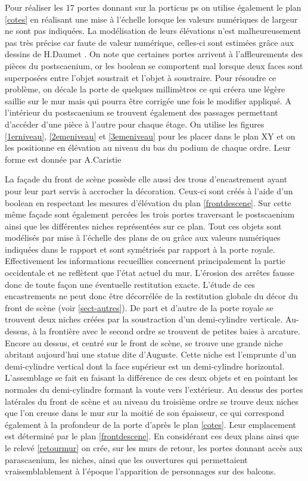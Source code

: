 Pour réaliser les 17 portes donnant sur la \gls{porticus ps} on utilise également le plan \ref{cotes} en réalisant une mise à l'échelle lorsque les valeurs numériques de largeur ne sont pas indiquées. La modélisation de leurs élévations n'est malheureusement pas très précise car faute de valeur numérique, celles-ci sont estimées grâce aux dessins de H.Daumet \cite[Pl. XII, XIII, XIV]{orangePl}. On note que certaines portes arrivent à l'affleurements des pièces du \gls{postscaenium}, or les \gls{boolean} se comportent mal lorsque deux faces sont superposées entre l'objet soustrait et l'objet à soustraire. Pour résoudre ce problème, on décale la porte de quelques millimètres ce qui créera une légère saillie sur le mur mais qui pourra être corrigée une fois le modifier appliqué. A l'intérieur du \gls{postscaenium} se trouvent également des passages permettant d'accéder d'une pièce à l'autre pour chaque étage. On utilise les figures \ref{1erniveau}, \ref{2emeniveau} et \ref{3emeniveau} pour les placer dans le plan XY et on les positionne en élévation au niveau du bas du podium de chaque ordre. Leur forme est donnée par A.Caristie \cite[Pl. II]{orangePl}

La façade du front de scène possède elle aussi des trous d'encastrement ayant pour leur part servis à accrocher la décoration. Ceux-ci sont créés à l'aide d'un \gls{boolean} en respectant les mesures d'élévation du plan \ref{frontdescene}. Sur cette même façade sont également percées les trois portes traversant le \gls{postscaenium} ainsi que les différentes niches représentées sur ce plan. Tout ces objets sont modélisés par mise à l'échelle des plans de \cite{orangePl} ou grâce aux valeurs numériques indiquées dans le rapport \cite[Chap. II]{orangeTxt} et sont symétrisés par rapport à la porte royale. Effectivement les informations recueillies concernent principalement la partie occidentale et ne reflètent que l'état actuel du mur. L'érosion des arrêtes fausse donc de toute façon une éventuelle restitution exacte. L'étude de ces encastrements ne peut donc être décorrélée de la restitution globale du décor du front de scène (voir \ref{sect-autres}). De part et d'autre de la porte royale se trouvent deux niches créées par la soustraction d'un demi-cylindre verticale. Au-dessus, à la frontière avec le second ordre se trouvent de petites baies à arcature. Encore au dessus, et centré sur le front de scène, se trouve une grande niche abritant aujourd'hui une statue dite d'Auguste. Cette niche est l'emprunte d'un demi-cylindre vertical dont la face supérieur est un demi-cylindre horizontal. L'assemblage se fait en faisant la différence de ces deux objets et en pointant les normales du demi-cylindre formant la voute vers l'extérieur. Au dessus des portes latérales du front de scène et au niveau du troisième ordre se trouve deux niches que l'on creuse dans le mur sur la moitié de son épaisseur, ce qui correspond également à la profondeur de la porte d'après le plan \ref{cotes}. Leur emplacement est déterminé par le plan \ref{frontdescene}. En considérant ces deux plans ainsi que le relevé \ref{retourmur} on crée, sur les murs de retour, les portes donnant accès aux \gls{parascaenium}, les niches, ainsi que les ouvertures qui permettaient vraisemblablement à l'époque l'apparition de personnages sur des balcons. 


